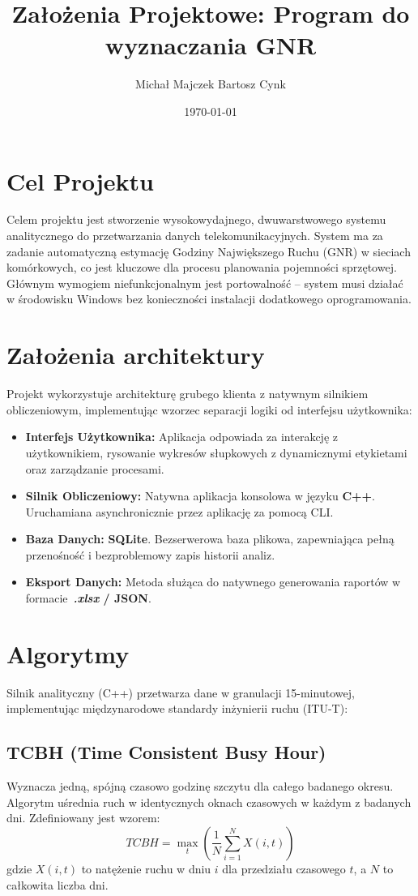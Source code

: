 \documentclass[12pt,a4paper]{article}
\title{\textbf{Założenia Projektowe: Program do wyznaczania GNR}}
\author{Michał Majczek Bartosz Cynk}
\date{\today}
\begin{document}
	
	\maketitle
	
	\section{Cel Projektu}
	Celem projektu jest stworzenie wysokowydajnego, dwuwarstwowego systemu analitycznego do przetwarzania danych telekomunikacyjnych. System ma za zadanie automatyczną estymację Godziny Największego Ruchu (GNR) w sieciach komórkowych, co jest kluczowe dla procesu planowania pojemności sprzętowej. Głównym wymogiem niefunkcjonalnym jest portowalność -- system musi działać w środowisku Windows bez konieczności instalacji dodatkowego oprogramowania.
	
	\section{Założenia architektury}
	Projekt wykorzystuje architekturę grubego klienta z natywnym silnikiem obliczeniowym, implementując wzorzec separacji logiki od interfejsu użytkownika:
	\begin{itemize}
		\item \textbf{Interfejs Użytkownika:} Aplikacja odpowiada za interakcję z użytkownikiem, rysowanie wykresów słupkowych z dynamicznymi etykietami oraz zarządzanie procesami.
		\item \textbf{Silnik Obliczeniowy:} Natywna aplikacja konsolowa w języku \textbf{C++}. Uruchamiana asynchronicznie przez aplikację za pomocą CLI.
		\item \textbf{Baza Danych:} \textbf{SQLite}. Bezserwerowa baza plikowa, zapewniająca pełną przenośność i bezproblemowy zapis historii analiz.
		\item \textbf{Eksport Danych:} Metoda służąca do natywnego generowania raportów w formacie~\textbf{\textit{.xlsx} / JSON}.
	\end{itemize}
	
	\section{Algorytmy}
	Silnik analityczny (C++) przetwarza dane w granulacji 15-minutowej, implementując międzynarodowe standardy inżynierii ruchu (ITU-T):
	
	\subsection{TCBH (Time Consistent Busy Hour)}
	Wyznacza jedną, spójną czasowo godzinę szczytu dla całego badanego okresu. Algorytm uśrednia ruch w identycznych oknach czasowych w każdym z badanych dni. Zdefiniowany jest wzorem:
	$$TCBH = \max_{t} \left( \frac{1}{N} \sum_{i=1}^{N} X(i, t) \right)$$
	gdzie $X(i, t)$ to natężenie ruchu w dniu $i$ dla przedziału czasowego $t$, a $N$ to całkowita liczba dni.
	
\end{document}
